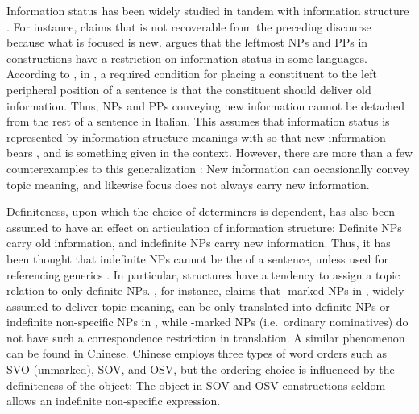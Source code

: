 Information status has been widely studied in tandem with information
structure \citep{gundel:03}.  For instance, \citet{halliday:67} claims
that  is not recoverable from the preceding discourse because
what is focused is new.  \citet{cinque:77} argues that the leftmost
NPs and PPs in  constructions have a restriction on
information status in some languages.  According to
\citeauthor{cinque:77}, in , a required condition for
placing a constituent to the left peripheral position of a sentence is
that the constituent should deliver old information. Thus, NPs and PPs
conveying new information cannot be detached from the rest of a
sentence in Italian.  This assumes that information status is
represented by information structure meanings with so that new
information bears , and  is something given in the context.
However, there are more than a few counterexamples to this
generalization \citep{erteschik:07}: New information can occasionally
convey topic meaning, and likewise focus does not always carry new
information.




Definiteness, upon which the choice of determiners is dependent, has
also been assumed to have an effect on articulation of information
structure: Definite NPs carry old information, and indefinite NPs
carry new information. Thus, it has been thought that indefinite NPs
cannot be the  of a sentence, unless used for referencing
generics \citep{lambrecht:96}.  In particular, 
structures have a tendency to assign a topic relation to only definite
NPs. \citet{kuroda:72}, for instance, claims that \wa-marked NPs in
, widely assumed to deliver topic meaning, can be only
translated into definite NPs or indefinite non-specific NPs in
, while \ga-marked NPs (i.e.\ ordinary nominatives) do not have
such a correspondence restriction in translation.  A similar
phenomenon can be found in Chinese.  Chinese employs three types of
word orders such as SVO (unmarked), SOV, and OSV, but the ordering
choice is influenced by the definiteness of the object: The
 object in SOV and OSV constructions seldom allows an
indefinite non-specific expression.







